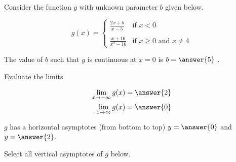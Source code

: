 \documentclass{ximera}
\author{Nela Lakos \and Kyle Parsons}
\begin{document}
\begin{exercise}

Consider the function $g$ with unknown parameter $b$ given below.

\[
g(x) = 
\begin{cases}
\frac{2x+b}{x-5} & \text{if } x<0\\ \\
\frac{x+16}{x^2-16}  & \text{if } x\geq0 \text{ and } x\neq 4
\end{cases}
\]

The value of $b$ such that $g$ is continuous at $x=0$ is $b=\answer{5}$ .

\begin{exercise}

Evaluate the limits.

\begin{align*}
\lim_{x\to-\infty}g(x) &= \answer{2}\\
\lim_{x\to\infty}g(x) &= \answer{0}
\end{align*}

\begin{exercise}

$g$ has a horizontal asymptotes (from bottom to top) $y=\answer{0}$ and $y=\answer{2}$.

\begin{exercise}

Select all vertical asymptotes of $g$ below.

\begin{selectAll}
\end{selectAll}

\end{exercise}
\end{exercise}
\end{exercise}
\end{exercise}
\end{document}
